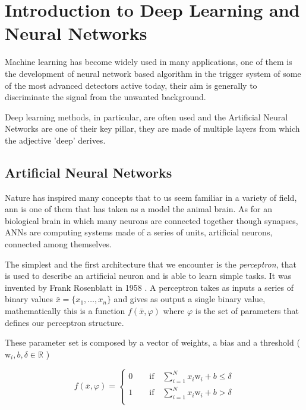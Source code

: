 \documentclass[../../main.tex]{subfiles}
\begin{document}
\chapter{Introduction to Deep Learning and Neural Networks}
\label{sec:NN_int}
Machine learning has become widely used in many applications, one of them is the development of neural network based algorithm in the trigger system of some of the most advanced detectors active today, their aim is generally to discriminate the signal from the unwanted background.  
    
Deep learning methods, in particular, are often used and the Artificial Neural Networks are one of their key pillar, they are made of multiple layers from which the adjective ’deep’ derives. 
    
\section{Artificial Neural Networks}
\label{sec:ANN}
Nature has inspired many concepts that to us seem familiar in a variety of field, \acrfull{ann} is one of them that has taken as a model the animal brain. As for an biological brain in which many neurons are connected together though synapses, ANNs are computing systems made of a series of units, artificial neurons, connected among themselves.  
    
The simplest and the first architecture that we encounter is the \textit{perceptron}, that is used to describe an artificial neuron and is able to learn simple tasks. It was invented by Frank Rosenblatt in 1958 \cite{preceptron}. A perceptron takes as inputs a series of binary values $\bar{x}=\{x_1, \dots , x_n\}$ and gives as output a single binary value, mathematically this is a function $f(\bar{x},\varphi)$ where $\varphi$ is the set of parameters that defines our perceptron structure.  
    
These parameter set is composed by a vector of weights, a bias and a threshold ( $\text{w}_i,b, \delta \in \mathbb{R}$ )
    
\begin{equation}
    f(\bar{x},\varphi) = 
    \begin{cases}
    0\qquad\text{if}\quad\sum_{i=1}^N x_i \text{w}_i + b \leq \delta \\
    1\qquad\text{if}\quad\sum_{i=1}^N x_i \text{w}_i + b > \delta \\
    \end{cases}
\end{equation}
\end{document}
